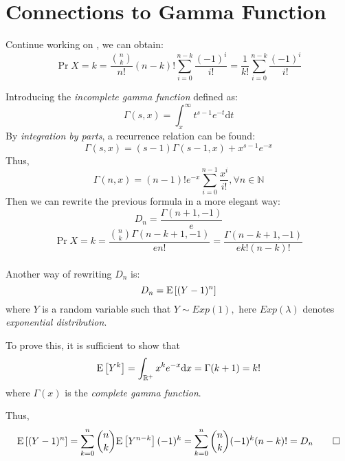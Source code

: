 
\section{Connections to Gamma Function}
Continue working on , we can obtain:
 \begin{equation}
 \Pr{X=k} = \dfrac{{n\choose{k}}}{n!}(n-k)!\sum_{i=0}^{n-k}{\dfrac{(-1)^i}{i!}} = \dfrac{1}{k!}\sum_{i=0}^{n-k}\dfrac{(-1)^i}{i!}
 \label{eqn:def-p}
 \end{equation}

Introducing the \emph{incomplete gamma function} defined as:
\[ \Gamma(s,x) = \int_{x}^{\infty}t^{s-1}e^{-t}\mathrm{d}t\]
By \emph{integration by parts}, a recurrence relation can be found:
\[ \Gamma(s,x) = (s-1)\Gamma(s-1,x) + x^{s-1}e^{-x}\]
Thus,
\begin{equation}
\Gamma(n,x) = (n-1)! e^{-x}\sum_{i=0}^{n-1}\dfrac{x^i}{i!}, \forall n\in \mathbb{N}
\label{eqn:rec-gamma}
\end{equation}
Then we can rewrite the previous formula in a more elegant way:
\[ D_n = \dfrac{\Gamma(n+1, -1)}{e}\]
\[ \Pr{X=k}=\dfrac{{n\choose{k}}\Gamma(n-k+1,-1)}{en!} =\dfrac{\Gamma(n-k+1,-1)}{ek!(n-k)!}\]
\\

Another way of rewriting $ D_n$ is:
\[ D_n = \text{E}\left[(Y-1)^n\right]\]
where $ Y$ is a random variable such that $ Y\sim Exp(1),$
here  $Exp(\lambda) $ denotes \emph{exponential distribution}.

To prove this, it is sufficient to show that
\[ \E{Y^k} = \int_{\mathbb{R}^+}x^ke^{-x}\mathrm{d}x = \Gamma(k+1) = k!\]
where $ \Gamma(x)$ is the \emph{complete gamma function}.

Thus,
\[ \E{(Y-1)^n} = \sum_{k=0}^n{n\choose{k}}\E{Y^{n-k}}(-1)^k = \sum_{k=0}^n{n\choose k}(-1)^k(n-k)! = D_n \qed\]
